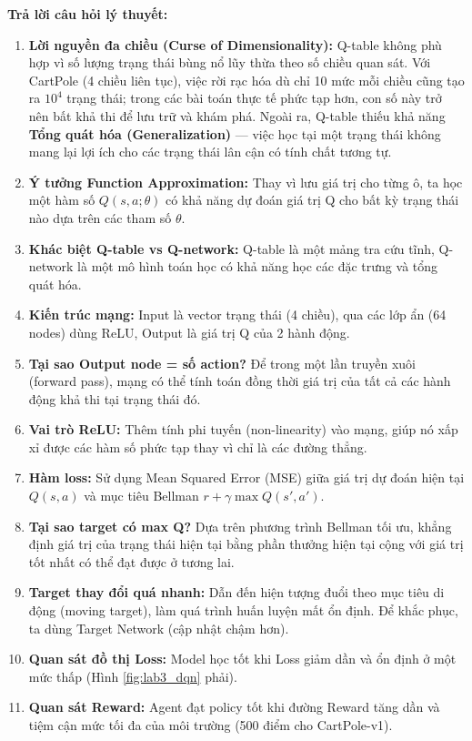 \textbf{Trả lời câu hỏi lý thuyết:}
\begin{enumerate}
    \item \textbf{Lời nguyền đa chiều (Curse of Dimensionality):} Q-table không phù hợp vì số lượng trạng thái bùng nổ lũy thừa theo số chiều quan sát. Với CartPole (4 chiều liên tục), việc rời rạc hóa dù chỉ 10 mức mỗi chiều cũng tạo ra $10^4$ trạng thái; trong các bài toán thực tế phức tạp hơn, con số này trở nên bất khả thi để lưu trữ và khám phá. Ngoài ra, Q-table thiếu khả năng \textbf{Tổng quát hóa (Generalization)} — việc học tại một trạng thái không mang lại lợi ích cho các trạng thái lân cận có tính chất tương tự.
    \item \textbf{Ý tưởng Function Approximation:} Thay vì lưu giá trị cho từng ô, ta học một hàm số $Q(s, a; \theta)$ có khả năng dự đoán giá trị Q cho bất kỳ trạng thái nào dựa trên các tham số $\theta$.
    \item \textbf{Khác biệt Q-table vs Q-network:} Q-table là một mảng tra cứu tĩnh, Q-network là một mô hình toán học có khả năng học các đặc trưng và tổng quát hóa.
    \item \textbf{Kiến trúc mạng:} Input là vector trạng thái (4 chiều), qua các lớp ẩn (64 nodes) dùng ReLU, Output là giá trị Q của 2 hành động.
    \item \textbf{Tại sao Output node = số action?} Để trong một lần truyền xuôi (forward pass), mạng có thể tính toán đồng thời giá trị của tất cả các hành động khả thi tại trạng thái đó.
    \item \textbf{Vai trò ReLU:} Thêm tính phi tuyến (non-linearity) vào mạng, giúp nó xấp xỉ được các hàm số phức tạp thay vì chỉ là các đường thẳng.
    \item \textbf{Hàm loss:} Sử dụng Mean Squared Error (MSE) giữa giá trị dự đoán hiện tại $Q(s, a)$ và mục tiêu Bellman $r + \gamma \max Q(s', a')$.
    \item \textbf{Tại sao target có max Q?} Dựa trên phương trình Bellman tối ưu, khẳng định giá trị của trạng thái hiện tại bằng phần thưởng hiện tại cộng với giá trị tốt nhất có thể đạt được ở tương lai.
    \item \textbf{Target thay đổi quá nhanh:} Dẫn đến hiện tượng đuổi theo mục tiêu di động (moving target), làm quá trình huấn luyện mất ổn định. Để khắc phục, ta dùng Target Network (cập nhật chậm hơn).
    \item \textbf{Quan sát đồ thị Loss:} Model học tốt khi Loss giảm dần và ổn định ở một mức thấp (Hình \ref{fig:lab3_dqn} phải).
    \item \textbf{Quan sát Reward:} Agent đạt policy tốt khi đường Reward tăng dần và tiệm cận mức tối đa của môi trường (500 điểm cho CartPole-v1).
\end{enumerate}
